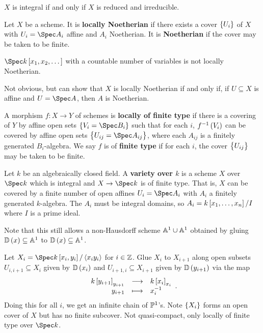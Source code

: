 \begin{theorem}
$ X $ is integral if and only if $ X $ is reduced and irreducible.
\end{theorem}

\begin{definition*}
Let $ X $ be a scheme. It is \textbf{locally Noetherian} if there exists a cover $ \cbr{U_i} $ of $ X $ with $ U_i = \Spec A_i $ affine and $ A_i $ Noetherian. It is \textbf{Noetherian} if the cover may be taken to be finite.
\end{definition*}

\begin{example*}
$ \Spec k\sbr{x_1, x_2, \dots} $ with a countable number of variables is not locally Noetherian.
\end{example*}

Not obvious, but can show that $ X $ is locally Noetherian if and only if, if $ U \subseteq X $ is affine and $ U = \Spec A $, then $ A $ is Noetherian.

\begin{definition*}
A morphism $ f : X \to Y $ of schemes is \textbf{locally of finite type} if there is a covering of $ Y $ by affine open sets $ \cbr{V_i = \Spec B_i} $ such that for each $ i $, $ f^{-1}\br{V_i} $ can be covered by affine open sets $ \cbr{U_{ij} = \Spec A_{ij}} $, where each $ A_{ij} $ is a finitely generated $ B_i $-algebra. We say $ f $ is of \textbf{finite type} if for each $ i $, the cover $ \cbr{U_{ij}} $ may be taken to be finite.
\end{definition*}

\begin{definition*}
Let $ k $ be an algebraically closed field. A \textbf{variety over $ k $} is a scheme $ X $ over $ \Spec k $ which is integral and $ X \to \Spec k $ is of finite type. That is, $ X $ can be covered by a finite number of open affines $ U_i = \Spec A_i $ with $ A_i $ a finitely generated $ k $-algebra. The $ A_i $ must be integral domains, so $ A_i = k\sbr{x_1, \dots, x_n} / I $ where $ I $ is a prime ideal.
\end{definition*}

Note that this still allows a non-Hausdorff scheme $ \AA^1 \cup \AA^1 $ obtained by gluing $ \DD\br{x} \subseteq \AA^1 $ to $ \DD\br{x} \subseteq \AA^1 $.

\begin{example*}
Let $ X_i = \Spec k\sbr{x_i, y_i} / \abr{x_iy_i} $ for $ i \in \ZZ $. Glue $ X_i $ to $ X_{i + 1} $ along open subsets $ U_{i, i + 1} \subseteq X_i $ given by $ \DD\br{x_i} $ and $ U_{i + 1, i} \subseteq X_{i + 1} $ given by $ \DD\br{y_{i + 1}} $ via the map
$$ \function{k\sbr{y_{i + 1}}_{y_{i + 1}}}{k\sbr{x_i}_{x_i}}{y_{i + 1}}{x_i^{-1}}. $$
Doing this for all $ i $, we get an infinite chain of $ \PP^1 $'s. Note $ \cbr{X_i} $ forms an open cover of $ X $ but has no finite subcover. Not quasi-compact, only locally of finite type over $ \Spec k $.
\end{example*}

